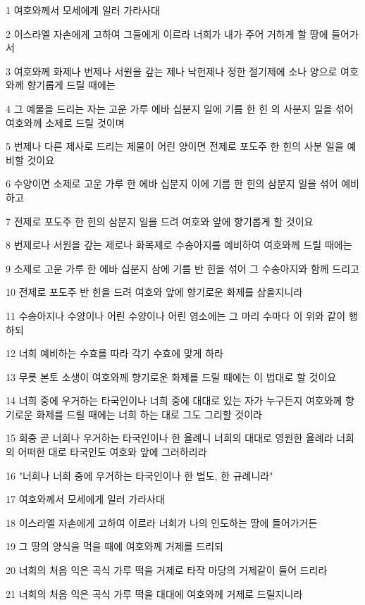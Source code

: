 \par 1 여호와께서 모세에게 일러 가라사대
\par 2 이스라엘 자손에게 고하여 그들에게 이르라 너희가 내가 주어 거하게 할 땅에 들어가서
\par 3 여호와께 화제나 번제나 서원을 갚는 제나 낙헌제나 정한 절기제에 소나 양으로 여호와께 향기롭게 드릴 때에는
\par 4 그 예물을 드리는 자는 고운 가루 에바 십분지 일에 기름 한 힌 의 사분지 일을 섞어 여호와께 소제로 드릴 것이며
\par 5 번제나 다른 제사로 드리는 제물이 어린 양이면 전제로 포도주 한 힌의 사분 일을 예비할 것이요
\par 6 수양이면 소제로 고운 가루 한 에바 십분지 이에 기름 한 힌의 삼분지 일을 섞어 예비하고
\par 7 전제로 포도주 한 힌의 삼분지 일을 드려 여호와 앞에 향기롭게 할 것이요
\par 8 번제로나 서원을 갚는 제로나 화목제로 수송아지를 예비하여 여호와께 드릴 때에는
\par 9 소제로 고운 가루 한 에바 십분지 삼에 기름 반 힌을 섞어 그 수송아지와 함께 드리고
\par 10 전제로 포도주 반 힌을 드려 여호와 앞에 향기로운 화제를 삼을지니라
\par 11 수송아지나 수양이나 어린 수양이나 어린 염소에는 그 마리 수마다 이 위와 같이 행하되
\par 12 너희 예비하는 수효를 따라 각기 수효에 맞게 하라
\par 13 무릇 본토 소생이 여호와께 향기로운 화제를 드릴 때에는 이 법대로 할 것이요
\par 14 너희 중에 우거하는 타국인이나 너희 중에 대대로 있는 자가 누구든지 여호와께 향기로운 화제를 드릴 때에는 너희 하는 대로 그도 그리할 것이라
\par 15 회중 곧 너희나 우거하는 타국인이나 한 율례니 너희의 대대로 영원한 율례라 너희의 어떠한 대로 타국인도 여호와 앞에 그러하리라
\par 16 "너희나 너희 중에 우거하는 타국인이나 한 법도, 한 규례니라"
\par 17 여호와께서 모세에게 일러 가라사대
\par 18 이스라엘 자손에게 고하여 이르라 너희가 나의 인도하는 땅에 들어가거든
\par 19 그 땅의 양식을 먹을 때에 여호와께 거제를 드리되
\par 20 너희의 처음 익은 곡식 가루 떡을 거제로 타작 마당의 거제같이 들어 드리라
\par 21 너희의 처음 익은 곡식 가루 떡을 대대에 여호와께 거제로 드릴지니라
